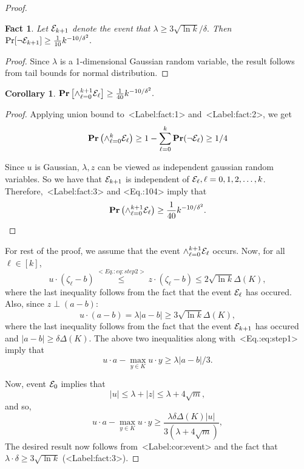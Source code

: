 \documentclass[11pt,letterpaper]{article}
\newcounter{note}[section]
\def\Cref#1{<Label:#1>}%
\def\eqref#1{<Eq.:#1>}%
\newtheorem{fact}[theorem]{Fact}
\newtheorem{corollary}[theorem]{Corollary}
\theoremstyle{definition}
\theoremstyle{remark}
\newcommand{\cE}{{\cal E}}
\newcommand{\prob}{{\mathbf{Pr}}}
\newcommand{\dia}{\Delta}
\begin{document}
\begin{proof}
\begin{fact}
\label{fact:3}
Let
${\cal E}_{k+1}$ denote the event that $\lambda\geq 3\sqrt{\ln k}/\delta.$ Then $\Pr[\neg \cE_{k+1}] \geq  \frac{1}{10} k^{-10/\delta^2}.$
\end{fact}
\begin{proof}
Since $\lambda$ is a 1-dimensional Gaussian random variable, the result follows from tail bounds for normal distribution. 
\end{proof}

\begin{corollary}
\label{cor:event}
$\prob\left[ \wedge_{\ell=0}^{k+1} {\cal E}_\ell\right] \geq \frac{1}{40}    k^{-10/\delta^2}.$
\end{corollary}

\begin{proof}
Applying union bound to~\Cref{fact:1} and~\Cref{fact:2}, we get 
\begin{equation}
\label{104}
\prob\left( \wedge _{\ell=0}^{k}{\cal E}_\ell \right)\geq 1-\sum_{\ell=0}^{k}\prob(\neg {\cal E}_\ell)
\geq 1/4 
\end{equation}

Since $u$ is Gaussian, $\lambda , z$ can be viewed as independent gaussian random variables. So we have that ${\cal E}_{k+1}$ is independent of ${\cal E}_\ell,\ell=0,1,2,\ldots , k$. Therefore,~\Cref{fact:3} and \eqref{104} imply that 
\begin{equation*}
\prob\left( \wedge_{\ell=0}^{k+1} {\cal E}_\ell\right)\geq  \frac{1}{40}    k^{-10/\delta^2}.
\end{equation*}
\end{proof}

For rest of the proof, we assume that the event $\wedge _{\ell=0}^{k+1}{\cal E}_\ell$ occurs. Now, for all $\ell \in [k]$, 
\begin{equation}\label{722}
u\cdot (\zeta_\ell-b) \stackrel{\eqref{eq:step2}}{\leq} z\cdot (\zeta_\ell-b)\leq
2\sqrt{\ln k} \dia(K),
\end{equation}
where the last inequality follows from the fact that the event $\cE_\ell$ has occured.
Also, since $z\perp (a-b)$:
\begin{equation}\label{723}
u\cdot (a-b)=\lambda |a-b|\geq 3\sqrt{\ln k} \dia(K),
\end{equation}
where the last inequality follows from the fact that the event $\cE_{k+1}$ has occured and $|a-b| \geq \delta \dia(K)$. 
The above two inequalities along with~\eqref{eq:step1} imply that 
$$u\cdot a - \max_{y\in K}u\cdot y \geq \lambda |a-b|/3.$$


Now, event $\cE_0$  implies that 
$$|u|\leq \lambda + |z|\leq \lambda+4\sqrt m, $$
and so, 
$$ u\cdot a - \max_{y\in K}u\cdot y  \geq \frac{\lambda \delta \dia(K) |u|}{3(\lambda + 4 \sqrt{m})},$$ 
The desired result now follows from~\Cref{cor:event} and the fact that $\lambda \cdot \delta \geq 3 \sqrt{\ln k}$ (\Cref{fact:3}). 
\end{proof}
\end{document}
